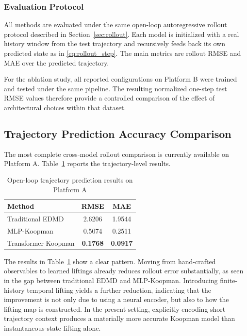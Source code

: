 \documentclass[journal]{IEEEtran}
\begin{document}
\subsubsection{Evaluation Protocol}

All methods are evaluated under the same open-loop autoregressive rollout protocol described in Section~\ref{sec:rollout}. Each model is initialized with a real history window from the test trajectory and recursively feeds back its own predicted state as in \eqref{eq:rollout_step}. The main metrics are rollout RMSE and MAE over the predicted trajectory.

For the ablation study, all reported configurations on Platform B were trained and tested under the same pipeline. The resulting normalized one-step test RMSE values therefore provide a controlled comparison of the effect of architectural choices within that dataset.

\subsection{Trajectory Prediction Accuracy Comparison}

The most complete cross-model rollout comparison is currently available on Platform A. Table~\ref{tab:prediction_platform_a} reports the trajectory-level results.

\begin{table}[!t]
\renewcommand{\arraystretch}{1.2}
\caption{Open-loop trajectory prediction results on Platform A}
\label{tab:prediction_platform_a}
\centering
\begin{tabular}{lcc}
\hline\hline
Method & RMSE & MAE \\
\hline
Traditional EDMD & 2.6206 & 1.9544 \\
MLP-Koopman & 0.5074 & 0.2511 \\
Transformer-Koopman & \textbf{0.1768} & \textbf{0.0917} \\
\hline\hline
\end{tabular}
\end{table}

The results in Table~\ref{tab:prediction_platform_a} show a clear pattern. Moving from hand-crafted observables to learned liftings already reduces rollout error substantially, as seen in the gap between traditional EDMD and MLP-Koopman. Introducing finite-history temporal lifting yields a further reduction, indicating that the improvement is not only due to using a neural encoder, but also to how the lifting map is constructed. In the present setting, explicitly encoding short trajectory context produces a materially more accurate Koopman model than instantaneous-state lifting alone.
\end{document}
